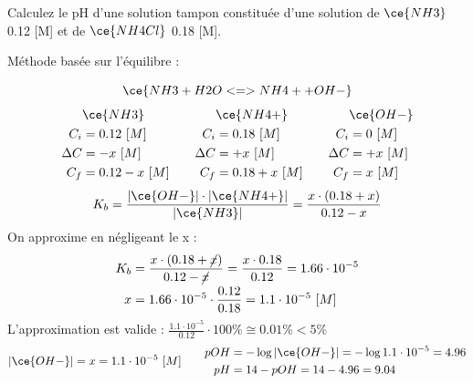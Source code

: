 \documentclass[
  11pt,
  a4paper,
  openany]{book}
\begin{document}
\begin{Exercise}
Calculez le pH d'une solution tampon constituée d'une solution de \(\ce{NH3}\) 0.12 {[}M{]} et de \(\ce{NH4Cl}\) 0.18 {[}M{]}.

\end{Exercise}

\begin{Answer}
Méthode basée sur l'équilibre :

\[
\ce{NH3 + H2O <=> NH4+ + OH-}
\]
\[
\begin{split}
&\ce{NH3}\\
C_i &= 0.12\ [M] \\
\Delta C &= - x\ [M] \\
C_f &= 0.12 - x\ [M] \\
\end{split}
\qquad
\begin{split}
&\ce{NH4+}\\
C_i &= 0.18\ [M] \\
\Delta C &= + x\ [M] \\
C_f &= 0.18 + x\ [M] \\
\end{split}
\qquad
\begin{split}
&\ce{OH-}\\
C_i &= 0\ [M] \\
\Delta C &= + x\ [M] \\
C_f &= x\ [M] \\
\end{split}
\]
\[
K_b = \frac{|\ce{OH-}| \cdot |\ce{NH4+}|}{|\ce{NH3}|} = \frac{x \cdot (0.18 + x)}{0.12 - x}
\]
On approxime en négligeant le x :
\[
\begin{split}
K_b &= \frac{x \cdot (0.18 + \cancel{x})}{0.12 - \cancel{x}} = \frac{x \cdot 0.18}{0.12} = 1.66 \cdot 10^{-5} \\
x &= 1.66 \cdot 10^{-5} \cdot \frac{0.12}{0.18} = 1.1 \cdot 10^{-5}\ [M]
\end{split}
\]
L'approximation est valide : \(\frac{1.1 \cdot 10^{-5}}{0.12} \cdot 100\% \cong 0.01\% < 5\%\)
\[
\begin{split}
|\ce{OH-}| = x = 1.1 \cdot 10^{-5}\ [M] 
\end{split}
\qquad
\begin{split}
pOH &= - \log |\ce{OH-}| = - \log 1.1 \cdot 10^{-5} = 4.96 \\
pH &= 14 - pOH = 14 - 4.96 = 9.04
\end{split}
\]


\end{Answer}
\end{document}
